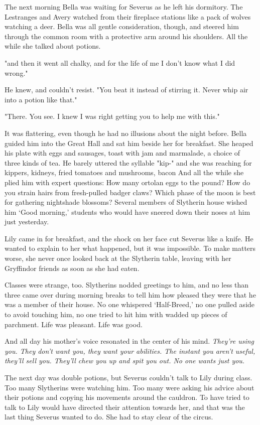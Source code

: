 The next morning Bella was waiting for Severus as he left his dormitory. The Lestranges and Avery watched from their fireplace stations like a pack of wolves watching a deer. Bella was all gentle consideration, though, and steered him through the common room with a protective arm around his shoulders. All the while she talked about potions.

"{\el}and then it went all chalky, and for the life of me I don't know what I did wrong."

He knew, and couldn't resist. "You{\el} beat it instead of{\el} stirring it. Never whip{\el} air into a potion like{\el} that."

"There. You see. I knew I was right getting you to help me with this."

It was flattering, even though he had no illusions about the night before. Bella guided him into the Great Hall and sat him beside her for breakfast. She heaped his plate with eggs and sausages, toast with jam and marmalade, a choice of three kinds of tea. He barely uttered the syllable "kip-" and she was reaching for kippers, kidneys, fried tomatoes and mushrooms, bacon{\el} And all the while she plied him with expert questions: How many ortolan eggs to the pound? How do you strain hairs from fresh-pulled badger claws? Which phase of the moon is best for gathering nightshade blossoms? Several members of Slytherin house wished him `Good morning,' students who would have sneered down their noses at him just yesterday.

Lily came in for breakfast, and the shock on her face cut Severus like a knife. He wanted to explain to her what happened, but it was impossible. To make matters worse, she never once looked back at the Slytherin table, leaving with her Gryffindor friends as soon as she had eaten.

Classes were strange, too. Slytherins nodded greetings to him, and no less than three came over during morning breaks to tell him how pleased they were that he was a member of their house. No one whispered `Half-Breed,' no one pulled aside to avoid touching him, no one tried to hit him with wadded up pieces of parchment. Life was pleasant. Life was good.

And all day his mother's voice resonated in the center of his mind. \emph{They're using you. They don't want you, they want your abilities. The instant you aren't useful, they'll sell you. They'll chew you up and spit you out. No one wants just you.}

The next day was double potions, but Severus couldn't talk to Lily during class. Too many Slytherins were watching him. Too many were asking his advice about their potions and copying his movements around the cauldron. To have tried to talk to Lily would have directed their attention towards her, and that was the last thing Severus wanted to do. She had to stay clear of the circus.

